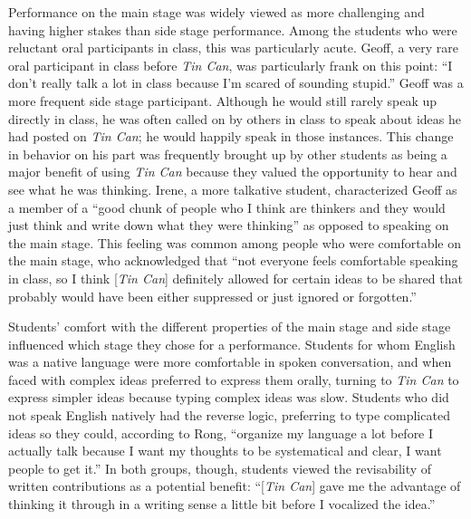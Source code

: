 Performance on the main stage was widely viewed as more challenging and having higher stakes than side stage performance. Among the students who were reluctant oral participants in class, this was particularly acute. Geoff, a very rare oral participant in class before \emph{Tin Can}, was particularly frank on this point: ``I don't really talk a lot in class because I'm scared of sounding stupid.'' Geoff was a more frequent side stage participant. Although he would still rarely speak up directly in class, he was often called on by others in class to speak about ideas he had posted on \emph{Tin Can}; he would happily speak in those instances. This change in behavior on his part was frequently brought up by other students as being a major benefit of using \emph{Tin Can} because they valued the opportunity to hear and see what he was thinking. Irene, a more talkative student, characterized Geoff as a member of a ``good chunk of people who I think are thinkers and they would just think and write down what they were thinking'' as opposed to speaking on the main stage. This feeling was common among people who were comfortable on the main stage, who acknowledged that ``not everyone feels comfortable speaking in class, so I think [\emph{Tin Can}] definitely allowed for certain ideas to be shared that probably would have been either suppressed or just ignored or forgotten.''

Students' comfort with the different properties of the main stage and side stage influenced which stage they chose for a performance. Students for whom English was a native language were more comfortable in spoken conversation, and when faced with complex ideas preferred to express them orally, turning to \emph{Tin Can} to express simpler ideas because typing complex ideas was slow. Students who did not speak English natively had the reverse logic, preferring to type complicated ideas so they could, according to Rong, ``organize my language a lot before I actually talk because I want my thoughts to be systematical and clear, I want people to get it.'' In both groups, though, students viewed the revisability of written contributions as a potential benefit: ``[\emph{Tin Can}] gave me the advantage of thinking it through in a writing sense a little bit before I vocalized the idea.''

